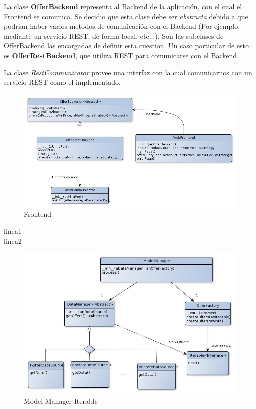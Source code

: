 \documentclass[10pt, a4paper]{article}
\begin{document}
La clase \textbf{OfferBackend} representa al Backend de la aplicación, con el cual el Frontend se comunica. Se decidio que esta clase debe ser \emph{abstracta} debido a que podrian haber varios metodos de comunicación con el Backend (Por ejemplo, mediante un servicio REST, de forma local, etc...). Son las subclases de OfferBackend las encargadas de definir esta cuestion. Un caso particular de esto es \textbf{OfferRestBackend}, que utiliza REST para comunicarse con el Backend. 

La clase \emph{RestCommunicator} provee una interfaz con la cual comunicarnos con un servicio REST como el implementado. 

\begin{figure}[H]
\centering
\includegraphics[scale=0.6]{graphics/frontend_class.jpg}
\caption{Frontend}
\end{figure}

linea1\\
linea2\\
\begin{figure}[H]
\centering
\includegraphics[scale=0.55]{graphics/model_manager_iterable_class.jpg}
\caption{Model Manager Iterable}
\end{figure}
\end{document}
